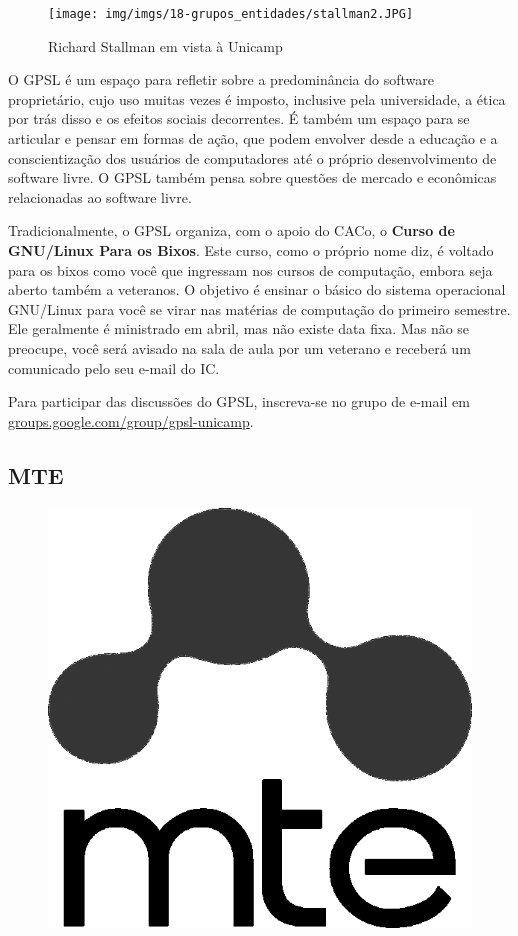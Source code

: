 \begin{figure}[h!]
    \centering
    \texttt{[image: img/imgs/18-grupos\_entidades/stallman2.JPG]}
    \caption{Richard Stallman em vista à Unicamp}
\end{figure}

O GPSL é um espaço para refletir sobre a predominância do software proprietário,
cujo uso muitas vezes é imposto, inclusive pela universidade, a ética por trás
disso e os efeitos sociais decorrentes. É também um espaço para se articular e
pensar em formas de ação, que podem envolver desde a educação e a
conscientização dos usuários de computadores até o próprio desenvolvimento de
software livre. O GPSL também pensa sobre questões de mercado e econômicas
relacionadas ao software livre.

Tradicionalmente, o GPSL organiza, com o apoio do CACo, o \textbf{Curso de
GNU/Linux Para os Bixos}. Este curso, como o próprio nome diz, é voltado para os
bixos como você que ingressam nos cursos de computação, embora seja aberto
também a veteranos. O objetivo é ensinar o básico do sistema operacional
GNU/Linux para você se virar nas matérias de computação do primeiro semestre.
Ele geralmente é ministrado em abril, mas não existe data fixa. Mas não se
preocupe, você será avisado na sala de aula por um veterano e receberá um
comunicado pelo seu e-mail do IC.

Para participar das discussões do GPSL, inscreva-se no grupo de e-mail em
\url{groups.google.com/group/gpsl-unicamp}.

\subsection{MTE}

\begin{figure}[H]
    \centering
    \includegraphics[scale=0.40]{img/mte.png}
\end{figure}

